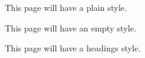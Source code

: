\documentclass{article}
\begin{document}
This page will have a plain style.
\thispagestyle{plain}

\newpage

This page will have an empty style.
\thispagestyle{empty}

\newpage

This page will have a headings style.
\thispagestyle{headings}
\end{document}
